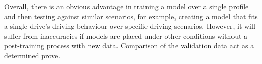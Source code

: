 %
%
%
%
%
%
%
%
%
%
%
%
% 
%
%
Overall, there is an obvious advantage in training a model over a single profile and then testing against similar scenarios, for example, creating a model that fits a single drive's driving behaviour over specific driving scenarios.
However, it will suffer from inaccuracies if models are placed under other conditions without a post-training process with new data.
Comparison of the validation data act as a determined prove.
